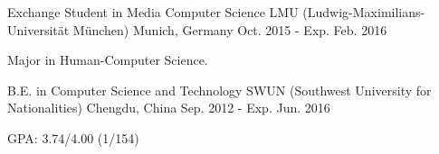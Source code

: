 \begin{cventries}
  \cventry
    {Exchange Student in Media Computer Science}
    {LMU (Ludwig-Maximilians-Universität München)}
    {Munich, Germany}
    {Oct. 2015 - Exp. Feb. 2016}
    {
      \begin{cvitems}
        \item {Major in Human-Computer Science.}
      \end{cvitems}
    }
\end{cventries}

\begin{cventries}
  \cventry
    {B.E. in Computer Science and Technology}
    {SWUN (Southwest University for Nationalities)}
    {Chengdu, China}
    {Sep. 2012 - Exp. Jun. 2016}
    {
      \begin{cvitems}
        \item {GPA: 3.74/4.00 (1/154)}
      \end{cvitems}
    }
\end{cventries}

